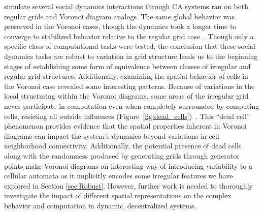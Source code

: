 \documentclass[a4paper,11pt]{report}
\begin{document}
\citeauthor{fl01} simulate several social dynamics interactions through CA systems ran on both regular grids and Voronoi diagram analogs. The same global behavior was preserved in the Voronoi cases, though the dynamics took a longer time to converge to stabilized behavior relative to the regular grid case~\cite{fl01}. Though only a specific class of computational tasks were tested, the conclusion that these social dynamics tasks are robust to variation in grid structure leads us to the beginning stages of establishing some form of equivalence between classes of irregular and regular grid structures. Additionally, examining the spatial behavior of cells in the Voronoi case revealed some interesting patterns. Because of variations in the local structuring within the Voronoi diagrams, some areas of the irregular grid never participate in computation even when completely surrounded by computing cells, resisting all outside influences (Figure~\ref{fig:dead_cells})~\cite{fl01}. This ``dead cell'' phenomenon provides evidence that the spatial properties inherent in Voronoi diagrams can impact the system's dynamics beyond variations in cell neighborhood connectivity.
Additionally, the potential presence of dead cells along with the randomness produced by generating grids through generator points make Voronoi diagrams an interesting way of introducing variability to a cellular automata as it implicitly encodes some irregular features we have explored in Section \ref{sec:Robust}. However, further work is needed to thoroughly investigate the impact of different spatial representations on the complex behavior and computation in dynamic, decentralized systems. 
\end{document}
